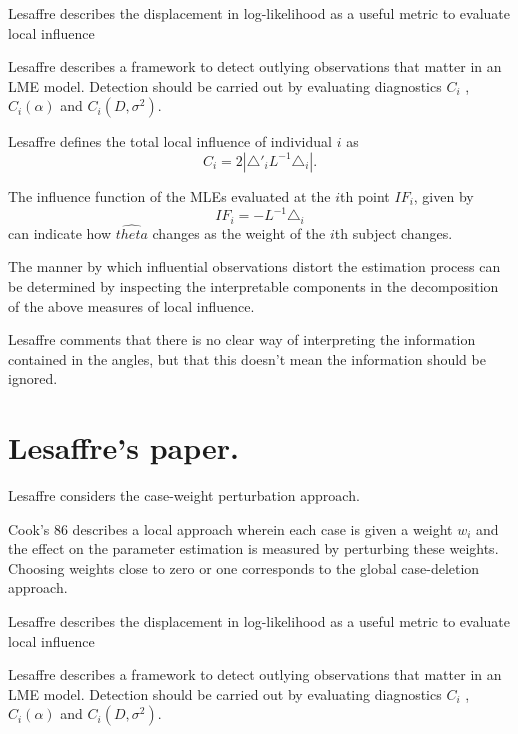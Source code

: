 \documentclass[MAIN.tex]{subfiles}
\begin{document}
Lesaffre  describes the displacement in log-likelihood as a useful
metric to evaluate local influence %


Lesaffre describes a framework to detect outlying observations
that matter in an LME model. Detection should be carried out by
evaluating diagnostics $C_{i}$ , $C_{i}(\alpha)$ and $C_{i}(D,
\sigma^2)$.


Lesaffre defines the total local influence of individual $i$ as
\begin{equation}
C_{i} = 2 | \triangle \prime _{i} L^{-1} \triangle_{i}|.
\end{equation}


\newpage
The influence function of the MLEs evaluated at the $i$th point
$IF_{i}$, given by
\begin{equation}
IF_{i} = -L^{-1}\triangle _{i}
\end{equation}
can indicate how $\hat{theta}$ changes as the weight of the $i$th
subject changes.




The manner by which influential observations
distort the estimation process can be determined by inspecting the
interpretable components in the decomposition of the above
measures of local influence.


Lesaffre comments that there is no clear way of interpreting the
information contained in the angles, but that this doesn't mean
the information should be ignored.


\section{Lesaffre's paper.}
Lesaffre considers the case-weight perturbation approach.


\citep{cook86}
Cook's 86 describes a local approach wherein each case is given a
weight $w_{i}$ and the effect on the parameter estimation is
measured by perturbing these weights. Choosing weights close to
zero or one corresponds to the global case-deletion approach.

Lesaffre  describes the displacement in log-likelihood as a useful
metric to evaluate local influence %

Lesaffre describes a framework to detect outlying observations
that matter in an LME model. Detection should be carried out by
evaluating diagnostics $C_{i}$ , $C_{i}(\alpha)$ and $C_{i}(D,
\sigma^2)$.
\end{document}
